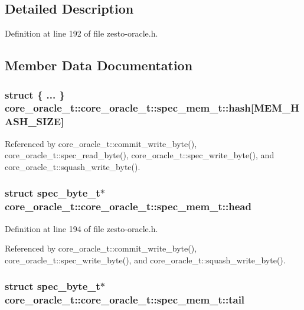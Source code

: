 \subsection{Detailed Description}


Definition at line 192 of file zesto-oracle.h.

\subsection{Member Data Documentation}
\subsubsection[{hash}]{\setlength{\rightskip}{0pt plus 5cm}struct \{ ... \}   core\_\-oracle\_\-t::core\_\-oracle\_\-t::spec\_\-mem\_\-t::hash[MEM\_\-HASH\_\-SIZE]}\label{structcore__oracle__t_1_1spec__mem__t_f2b18bc5ab0ad487ac700714f2ef6f32}




Referenced by core\_\-oracle\_\-t::commit\_\-write\_\-byte(), core\_\-oracle\_\-t::spec\_\-read\_\-byte(), core\_\-oracle\_\-t::spec\_\-write\_\-byte(), and core\_\-oracle\_\-t::squash\_\-write\_\-byte().
\subsubsection[{head}]{\setlength{\rightskip}{0pt plus 5cm}struct {\bf spec\_\-byte\_\-t}$\ast$ core\_\-oracle\_\-t::core\_\-oracle\_\-t::spec\_\-mem\_\-t::head\hspace{0.3cm}{\tt  [read]}}\label{structcore__oracle__t_1_1spec__mem__t_6e2657bc63a3f2e608a24a83ae33b9da}




Definition at line 194 of file zesto-oracle.h.

Referenced by core\_\-oracle\_\-t::commit\_\-write\_\-byte(), core\_\-oracle\_\-t::spec\_\-write\_\-byte(), and core\_\-oracle\_\-t::squash\_\-write\_\-byte().
\subsubsection[{tail}]{\setlength{\rightskip}{0pt plus 5cm}struct {\bf spec\_\-byte\_\-t}$\ast$ core\_\-oracle\_\-t::core\_\-oracle\_\-t::spec\_\-mem\_\-t::tail\hspace{0.3cm}{\tt  [read]}}\label{structcore__oracle__t_1_1spec__mem__t_202bd357c75052e5533179bfe0f69565}




